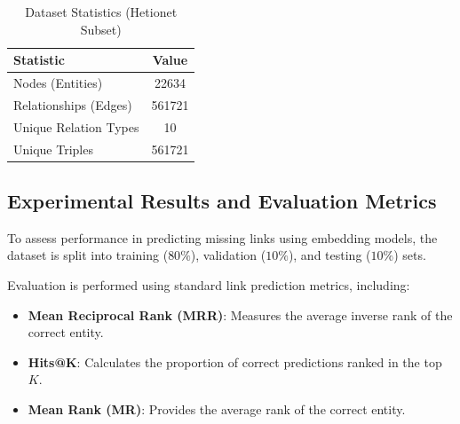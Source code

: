 \begin{table}[ht]
    \centering
    \caption{Dataset Statistics (Hetionet Subset)}
    \begin{tabular}{l c}
        \hline
        \textbf{Statistic}    & \textbf{Value} \\
        \hline
        Nodes (Entities)      & 22634          \\ %
        Relationships (Edges) & 561721         \\ %
        Unique Relation Types & 10             \\ %
        Unique Triples        & 561721         \\ %
        \hline
    \end{tabular}
    \label{tab:dataset_stats}
\end{table}

\subsection*{Experimental Results and Evaluation Metrics}

To assess performance in predicting missing links using embedding models, the dataset is split into training ($80\%$), validation ($10\%$), and testing ($10\%$) sets.

Evaluation is performed using standard link prediction metrics, including:

\begin{itemize}
    \item \textbf{Mean Reciprocal Rank (MRR)}: Measures the average inverse rank of the correct entity. %
    \item \textbf{Hits@K}: Calculates the proportion of correct predictions ranked in the top $K$. %
    \item \textbf{Mean Rank (MR)}: Provides the average rank of the correct entity. %
\end{itemize}

